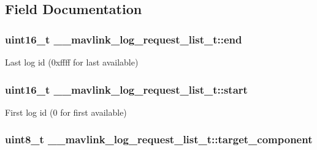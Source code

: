 \subsection{Field Documentation}
\hypertarget{struct____mavlink__log__request__list__t_ac97d4cabe91086ded48e57e515a53697}{
\subsubsection[{end}]{\setlength{\rightskip}{0pt plus 5cm}uint16\+\_\+t \+\_\+\+\_\+mavlink\+\_\+log\+\_\+request\+\_\+list\+\_\+t\+::end}}\label{struct____mavlink__log__request__list__t_ac97d4cabe91086ded48e57e515a53697}


Last log id (0xffff for last available) 

\hypertarget{struct____mavlink__log__request__list__t_a29bace0f7c80d2cf558afd956ec2e204}{
\subsubsection[{start}]{\setlength{\rightskip}{0pt plus 5cm}uint16\+\_\+t \+\_\+\+\_\+mavlink\+\_\+log\+\_\+request\+\_\+list\+\_\+t\+::start}}\label{struct____mavlink__log__request__list__t_a29bace0f7c80d2cf558afd956ec2e204}


First log id (0 for first available) 

\hypertarget{struct____mavlink__log__request__list__t_af2fa37e0302c439170d83f10f2906a3a}{
\subsubsection[{target\+\_\+component}]{\setlength{\rightskip}{0pt plus 5cm}uint8\+\_\+t \+\_\+\+\_\+mavlink\+\_\+log\+\_\+request\+\_\+list\+\_\+t\+::target\+\_\+component}}\label{struct____mavlink__log__request__list__t_af2fa37e0302c439170d83f10f2906a3a}


